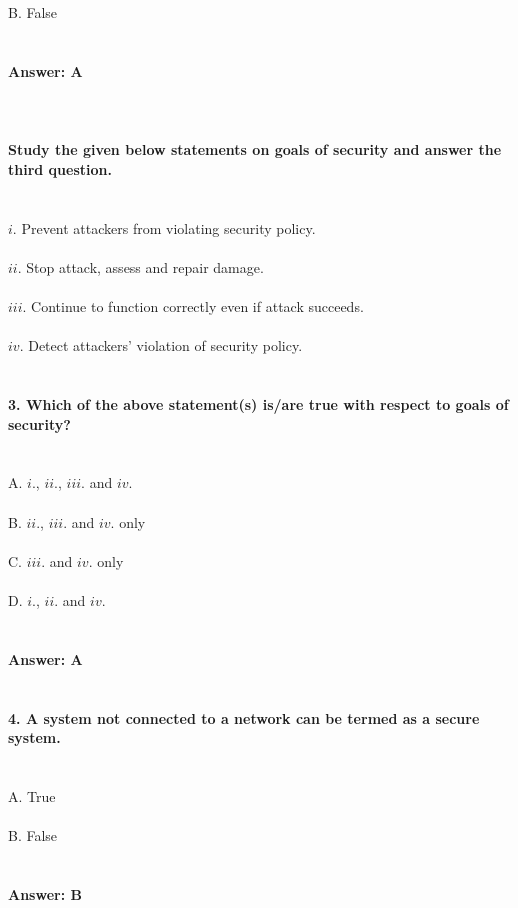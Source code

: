 \documentclass[prl,twocolumn,showpacs,preprintnumbers,superscriptaddress]{revtex4}
\theoremstyle{plain}
\theoremstyle{definition}
\begin{document}
\begin{widetext}
\\
\\
B. False 
\\
\\
\\
\textbf{Answer: A}
\\
\\
\\
\\
\textbf{Study the given below statements on goals of security and answer the third question.}
\\
\\
\\
$i.$ Prevent attackers from violating security policy.
\\
\\
$ii.$ Stop attack, assess and repair damage.
\\
\\
$iii.$ Continue to function correctly even if attack succeeds.
\\
\\
$iv.$ Detect attackers’ violation of security policy.
\\
\\
\\
\textbf{3. Which of the above statement(s) is/are true with respect to goals of security?}
\\
\\
\\
\noindent A. $i.$, $ii.$, $iii.$ and $iv.$
\\
\\
B. $ii.$, $iii.$ and $iv.$ only
\\
\\
C. $iii.$ and $iv.$ only
\\
\\
D. $i.$, $ii.$ and $iv.$
\\
\\
\\
\textbf{Answer: A}
\\
\\
\\
\textbf{4. A system not connected to a network can be termed as a secure system.}
\\
\\
\\
A. True
\\
\\
B. False
\\
\\
\\
\textbf{Answer: B}
\\

\end{widetext}
\end{document}
